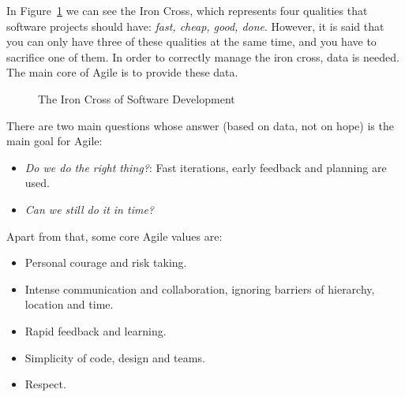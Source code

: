 In Figure~\ref{fig:iron-cross} we can see the Iron Cross, which represents four qualities that software projects should have: \emph{fast, cheap, good, done}. However, it is said that you can only have three of these qualities at the same time, and you have to sacrifice one of them. In order to correctly manage the iron cross, data is needed. The main core of Agile is to provide these data.
\begin{figure}
    \centering
    \caption{The Iron Cross of Software Development}
    \label{fig:iron-cross}
\end{figure}

There are two main questions whose answer (based on data, not on hope) is the main goal for Agile:
\begin{itemize}
    \item \emph{Do we do the right thing?}: Fast iterations, early feedback and planning are used.
    \item \emph{Can we still do it in time?}
\end{itemize}

Apart from that, some core Agile values are:
\begin{itemize}
    \item Personal courage and risk taking.
    \item Intense communication and collaboration, ignoring barriers of hierarchy, location and time.
    \item Rapid feedback and learning.
    \item Simplicity of code, design and teams.
    \item Respect.
\end{itemize}

